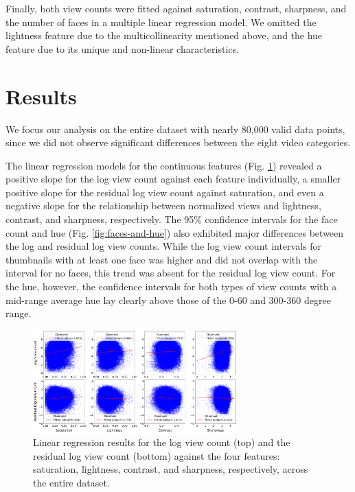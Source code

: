 \documentclass{article}
\begin{document}
Finally, both view counts were fitted against saturation, contrast, sharpness, and the number of faces in a multiple linear regression model. We omitted the lightness feature due to the multicollinearity mentioned above, and the hue feature due to its unique and non-linear characteristics.

\section{Results}
We focus our analysis on the entire dataset with nearly 80,000 valid data points, since we did not observe significant differences between the eight video categories.

The linear regression models for the continuous features (Fig. \ref{fig:lr}) revealed a positive slope for the log view count against each feature individually, a smaller positive slope for the residual log view count against saturation, and even a negative slope for the relationship between normalized views and lightness, contrast, and sharpness, respectively. The 95\% confidence intervals for the face count and hue (Fig. \ref{fig:faces-and-hue}) also exhibited major differences between the log and residual log view counts. While the log view count intervals for thumbnails with at least one face was higher and did not overlap with the interval for no faces, this trend was absent for the residual log view count. For the hue, however, the confidence intervals for both types of view counts with a mid-range average hue lay clearly above those of the 0-60 and 300-360 degree range.

\begin{figure}[h]


  \centering
  \includegraphics[width=0.7\textwidth]{figs/lr.png}
  \caption{Linear regression results for the log view count (top) and the residual log view count (bottom) against the four features: saturation, lightness, contrast, and sharpness, respectively, across the entire dataset.}
  \label{fig:lr}
\end{figure}
\end{document}
